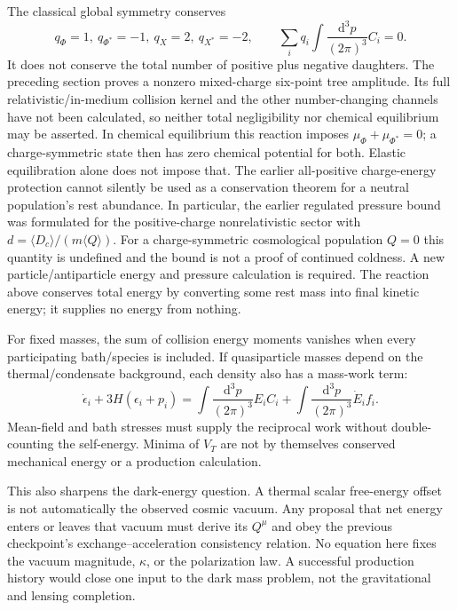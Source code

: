 \documentclass[11pt]{article}
\newcommand{\dd}{\mathrm d}
\begin{document}
The classical global symmetry conserves
\begin{equation}
 q_\Phi=1,\ q_{\Phi^*}=-1,\ q_X=2,\ q_{X^*}=-2,\qquad
 \sum_i q_i\int\frac{\dd^3p}{(2\pi)^3} C_i=0.
\end{equation}
It does not conserve the total number of positive plus negative daughters.
The preceding section proves a nonzero mixed-charge six-point tree amplitude.
Its full relativistic/in-medium collision kernel and the other number-changing
channels have not been calculated, so neither total negligibility nor
chemical equilibrium may be asserted. In chemical equilibrium this reaction
imposes $\mu_\Phi+\mu_{\Phi^*}=0$; a charge-symmetric state then has zero
chemical potential for both. Elastic equilibration alone does not impose that.
The earlier all-positive charge-energy protection cannot silently be used
as a conservation theorem for a neutral population's rest abundance.
In particular, the earlier regulated pressure bound was formulated for the
positive-charge nonrelativistic sector with $d=\langle D_c\rangle/(m\langle Q\rangle)$.
For a charge-symmetric cosmological population $Q=0$ this quantity is
undefined and the bound is not a proof of continued coldness. A new
particle/antiparticle energy and pressure calculation is required. The
reaction above conserves total energy by converting some rest mass into
final kinetic energy; it supplies no energy from nothing.

For fixed masses, the sum of collision energy moments vanishes when every
participating bath/species is included. If quasiparticle masses depend on
the thermal/condensate background, each density also has a mass-work term:
\begin{equation}
 \dot\epsilon_i+3H(\epsilon_i+p_i)
 =\int\frac{\dd^3p}{(2\pi)^3}E_i C_i
 +\int\frac{\dd^3p}{(2\pi)^3}\dot E_i f_i.
\end{equation}
Mean-field and bath stresses must supply the reciprocal work without
double-counting the self-energy. Minima of $V_T$ are not by themselves
conserved mechanical energy or a production calculation.

This also sharpens the dark-energy question. A thermal scalar free-energy
offset is not automatically the observed cosmic vacuum. Any proposal that
net energy enters or leaves that vacuum must derive its $Q^\mu$ and obey
the previous checkpoint's exchange--acceleration consistency relation.
No equation here fixes the vacuum magnitude, $\kappa$, or the polarization
law. A successful production history would close one input to the dark
mass problem, not the gravitational and lensing completion.
\end{document}
